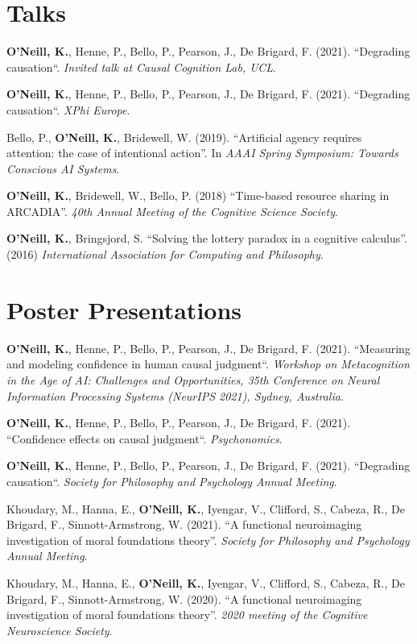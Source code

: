 \section{Talks}
\textbf{O'Neill, K.}, Henne, P., Bello, P., Pearson, J., De Brigard,
F. (2021). ``Degrading causation``. \emph{Invited talk at Causal
Cognition Lab, UCL}.

\textbf{O'Neill, K.}, Henne, P., Bello, P., Pearson, J., De Brigard,
F. (2021). ``Degrading causation``. \emph{XPhi Europe}.

Bello, P., \textbf{O'Neill, K.}, Bridewell, W. (2019). ``Artificial
agency requires attention: the case of intentional action''. In
\emph{AAAI Spring Symposium: Towards Conscious AI Systems}.

\textbf{O'Neill, K.}, Bridewell, W., Bello, P. (2018) ``Time-based
resource sharing in ARCADIA''. \emph{40th Annual Meeting of the
Cognitive Science Society}.

\textbf{O’Neill, K.}, Bringsjord, S. ``Solving the lottery paradox in
a cognitive calculus''. (2016) \emph{International Association for
Computing and Philosophy}.

\line\section{Poster Presentations}
\textbf{O'Neill, K.}, Henne, P., Bello, P., Pearson, J., De Brigard,
F. (2021). ``Measuring and modeling confidence in human causal
judgment``. \emph{Workshop on Metacognition in the Age of AI:
Challenges and Opportunities, 35th Conference on Neural Information
Processing Systems (NeurIPS 2021), Sydney, Australia}.

\textbf{O'Neill, K.}, Henne, P., Bello, P., Pearson, J., De Brigard,
F. (2021). ``Confidence effects on causal
judgment``. \emph{Psychonomics}.

\textbf{O'Neill, K.}, Henne, P., Bello, P., Pearson, J., De Brigard,
F. (2021). ``Degrading causation``. \emph{Society for Philosophy and
Psychology Annual Meeting}.

Khoudary, M., Hanna, E., \textbf{O’Neill, K.}, Iyengar, V., Clifford,
S., Cabeza, R., De Brigard, F., Sinnott-Armstrong, W. (2021). ``A
functional neuroimaging investigation of moral foundations
theory''. \emph{Society for Philosophy and Psychology Annual Meeting}.

Khoudary, M., Hanna, E., \textbf{O’Neill, K.}, Iyengar, V., Clifford,
S., Cabeza, R., De Brigard, F., Sinnott-Armstrong, W. (2020). ``A
functional neuroimaging investigation of moral foundations
theory''. \emph{2020 meeting of the Cognitive Neuroscience Society}.

